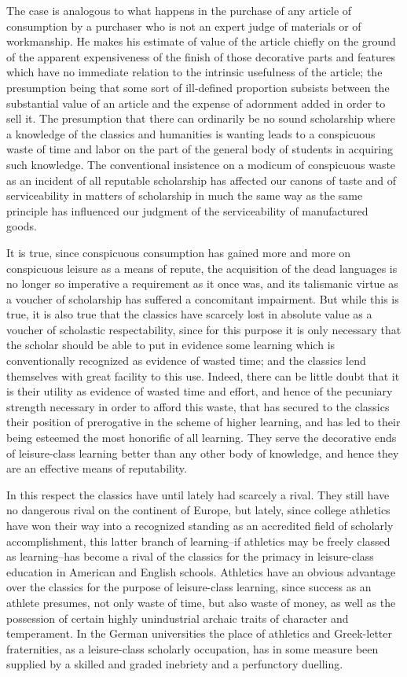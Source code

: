 \documentclass[12pt]{report}
\begin{document}
The case is analogous to what happens in the purchase of any article of
consumption by a purchaser who is not an expert judge of materials or
of workmanship. He makes his estimate of value of the article chiefly
on the ground of the apparent expensiveness of the finish of those
decorative parts and features which have no immediate relation to the
intrinsic usefulness of the article; the presumption being that some
sort of ill-defined proportion subsists between the substantial value of
an article and the expense of adornment added in order to sell it. The
presumption that there can ordinarily be no sound scholarship where
a knowledge of the classics and humanities is wanting leads to a
conspicuous waste of time and labor on the part of the general body of
students in acquiring such knowledge. The conventional insistence on a
modicum of conspicuous waste as an incident of all reputable scholarship
has affected our canons of taste and of serviceability in matters of
scholarship in much the same way as the same principle has influenced
our judgment of the serviceability of manufactured goods.

It is true, since conspicuous consumption has gained more and more on
conspicuous leisure as a means of repute, the acquisition of the dead
languages is no longer so imperative a requirement as it once was,
and its talismanic virtue as a voucher of scholarship has suffered a
concomitant impairment. But while this is true, it is also true that the
classics have scarcely lost in absolute value as a voucher of scholastic
respectability, since for this purpose it is only necessary that
the scholar should be able to put in evidence some learning which is
conventionally recognized as evidence of wasted time; and the classics
lend themselves with great facility to this use. Indeed, there can be
little doubt that it is their utility as evidence of wasted time and
effort, and hence of the pecuniary strength necessary in order to
afford this waste, that has secured to the classics their position of
prerogative in the scheme of higher learning, and has led to their being
esteemed the most honorific of all learning. They serve the decorative
ends of leisure-class learning better than any other body of knowledge,
and hence they are an effective means of reputability.

In this respect the classics have until lately had scarcely a rival.
They still have no dangerous rival on the continent of Europe, but
lately, since college athletics have won their way into a recognized
standing as an accredited field of scholarly accomplishment, this latter
branch of learning--if athletics may be freely classed as learning--has
become a rival of the classics for the primacy in leisure-class
education in American and English schools. Athletics have an obvious
advantage over the classics for the purpose of leisure-class learning,
since success as an athlete presumes, not only waste of time, but also
waste of money, as well as the possession of certain highly unindustrial
archaic traits of character and temperament. In the German universities
the place of athletics and Greek-letter fraternities, as a leisure-class
scholarly occupation, has in some measure been supplied by a skilled and
graded inebriety and a perfunctory duelling.
\end{document}
